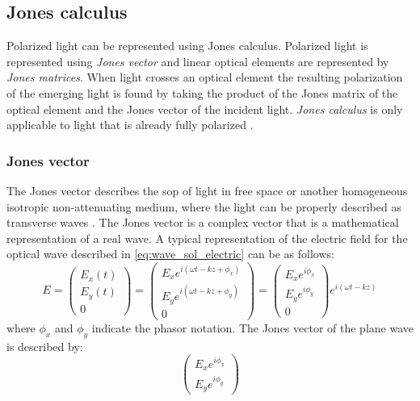 \documentclass[../report.tex]{subfiles}
\begin{document}
		\subsection{Jones calculus}
Polarized light can be represented using Jones calculus. Polarized light is represented using \textit{Jones vector} and linear optical elements are represented by \textit{Jones matrices}.	When light crosses an optical element the resulting polarization of the emerging light is found by taking the product of the Jones matrix of the optical element and the Jones vector of the incident light. \textit{Jones calculus} is only applicable to light that is already fully polarized \cite{burch_introduction_1975}.
		
			\subsubsection{Jones vector}
The Jones vector describes the \gls{sop} of light in free space or another homogeneous isotropic non-attenuating medium, where the light can be properly described as transverse waves \cite{burch_introduction_1975}. The Jones vector is a complex vector that is a mathematical representation of a real wave. A typical representation of the electric field for the optical wave described in \ref{eq:wave_sol_electric} can be as follows:
\begin{equation}\label{eq:jones_vector}
E = \left( \begin{matrix} E_{x}\left( t\right) \\ E_{y}\left( t\right) \\ 0\end{matrix} \right) = \left( \begin{matrix} E_{x}e^{i\left( \omega t - kz+\phi _{x}\right)} \\ E_{y}e^{i\left( \omega t - kz+\phi _{y}\right) }\\ 0\end{matrix} \right) = \left( \begin{matrix} E_{x}e^{i\phi_x}\\ E_{y}e^{i\phi_y}\\ 0 \end{matrix} \right)e^{i\left( \omega t - kz\right)} 
\end{equation}
where $\phi_x$ and $\phi_y$ indicate the phasor notation. The Jones vector of the plane wave is described by:
\begin{equation}\label{eq:jones_vector_form}
\left( \begin{matrix} E_{x}e^{i\phi_x}\\ E_{y}e^{i\phi_y}\end{matrix} \right) 
\end{equation}
\end{document}
